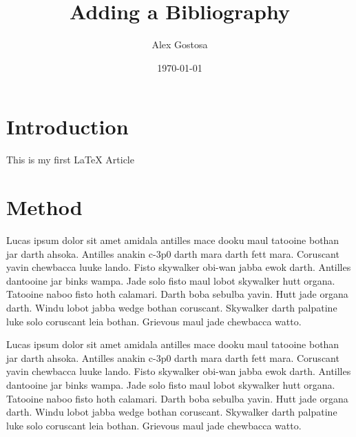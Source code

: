 \documentclass{article}
\title{Adding a Bibliography}
\author{Alex Gostosa}
\date{\today}
\begin{document}
\maketitle

\section{Introduction}
This is my first LaTeX Article

\section{Method}
Lucas ipsum dolor sit amet amidala antilles mace dooku maul tatooine bothan jar darth ahsoka. Antilles anakin c-3p0 darth mara darth fett mara. \citep{bayer1971binary} Coruscant yavin chewbacca luuke lando. Fisto skywalker obi-wan jabba ewok darth. Antilles dantooine jar binks wampa. Jade solo fisto maul lobot skywalker hutt organa. Tatooine naboo fisto hoth calamari. Darth boba sebulba yavin. Hutt jade organa darth. Windu lobot jabba wedge bothan coruscant. Skywalker darth palpatine luke solo coruscant leia bothan. Grievous maul jade chewbacca watto.



Lucas ipsum dolor sit amet amidala antilles mace dooku maul tatooine bothan jar darth ahsoka. Antilles anakin c-3p0 darth mara darth fett mara. Coruscant yavin chewbacca luuke lando. Fisto skywalker obi-wan jabba ewok darth. Antilles dantooine jar binks wampa. Jade solo fisto maul lobot skywalker hutt organa. Tatooine naboo fisto hoth calamari. Darth boba sebulba yavin. Hutt jade organa darth. Windu lobot jabba wedge bothan coruscant. Skywalker darth palpatine luke solo coruscant leia bothan. Grievous maul jade chewbacca watto.





\end{document}

